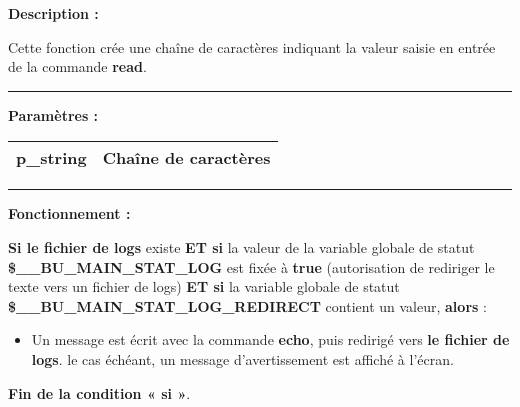 \documentclass[a4paper,10pt]{article}
\begin{document}
\begin{justify}
    \textbf{Description :}

    Cette fonction crée une chaîne de caractères indiquant la valeur saisie en entrée de la commande \textbf{\color{cmds}read}.
\end{justify}


\par\noindent\rule{\textwidth}{0.4pt}

\begin{justify}
    \textbf{Paramètres :}

    \begin{tabular}{|l|l|}
        \hline
        \textbf{\color{vars}p\_string} & Chaîne de caractères\\
        \hline
    \end{tabular}
\end{justify}


\par\noindent\rule{\textwidth}{0.4pt}

\begin{justify}
    \textbf{Fonctionnement :}

    \textbf{\color{cond}Si \color{path}le fichier de logs} existe \textbf{\color{cond}ET si} la valeur de la variable globale de statut \textbf{\color{vars}\$\_\_BU\_MAIN\_STAT\_LOG} est fixée à \textbf{true} (autorisation de rediriger le texte vers un fichier de logs) \textbf{\color{cond}ET si} la variable globale de statut \textbf{\color{vars}\$\_\_BU\_MAIN\_STAT\_LOG\_REDIRECT} contient un valeur, \textbf{\color{cond}alors} :

    \begin{itemize}
        \item
        {
            \begin{justify}
                Un message est écrit avec la commande \textbf{\color{cmds}echo}, puis redirigé vers \textbf{\color{path}le fichier de logs}. le cas échéant, un message d'avertissement est affiché à l'écran.
            \end{justify}
        }
    \end{itemize}
\end{justify}

\begin{justify}
    \textbf{\color{cond}Fin de la condition « si »}.
\end{justify}
\end{document}
